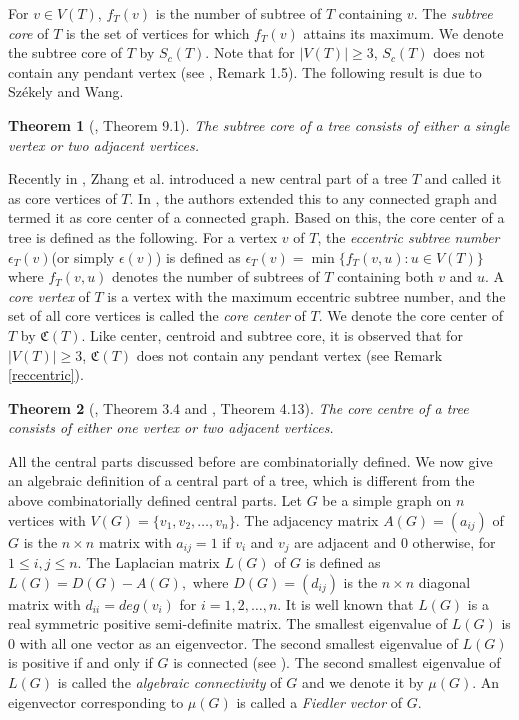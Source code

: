 \documentclass[11pt]{article}
\newtheorem{theorem}{Theorem}[section]
\begin{document}
For $v\in V(T)$, $f_T(v)$ is the number of subtree of $T$ containing $v$. The {\it subtree core} of $T$ is the set of vertices for which $f_T(v)$ attains its maximum. We denote the subtree core of $T$ by $S_c(T)$. Note that for $|V(T)|\geq 3$, $S_c(T)$ does not contain any pendant vertex (see \cite{Des}, Remark 1.5). The following result is due to  Sz\'ekely and Wang.

\begin{theorem}[\cite{Sze}, Theorem 9.1]\label{S and W}
The subtree core of a tree consists of either a single vertex or two adjacent vertices.
\end{theorem}

Recently in \cite{Zhang}, Zhang et al. introduced a new central part of a tree $T$ and called it as core vertices of $T$. In \cite{Pandey3}, the authors extended this to any connected graph and termed it as core center of a connected graph. Based on this, the core center of a  tree is defined as the following. For a vertex $v$ of  $T$, the {\it eccentric subtree number} $\epsilon_T(v)$(or simply $\epsilon(v)$) is defined as $\epsilon_T(v)=\min\{f_T(v,u): u\in V(T)\}$ where $f_T(v,u)$ denotes the number of subtrees of $T$ containing both $v$ and $u$. A {\it core vertex} of $T$ is a vertex with the maximum eccentric subtree number, and the set of all core vertices is called the {\it core center} of $T$. We denote the  core center of $T$ by $\mathfrak{C}(T)$. Like center, centroid and subtree core, it  is observed that for $|V(T)|\geq 3$,  $\mathfrak{C}(T)$ does not contain any pendant vertex (see Remark \ref{reccentric}).
 
\begin{theorem}[\cite{Zhang}, Theorem 3.4 and \cite{Pandey3}, Theorem 4.13]\label{zha}
The core centre of a tree consists of either one vertex or two adjacent vertices.
\end{theorem}

All the central parts discussed before are combinatorially defined. We now give an algebraic definition of a central part of a tree, which is different from  the  above combinatorially defined central parts. Let $G$ be a simple graph on $n$ vertices with $V(G)=\{v_1,v_2,\ldots,v_n\}$.  The adjacency matrix $A(G)=(a_{ij})$ of $G$ is the $n\times n$ matrix with $a_{ij}=1$ if $v_i$ and $v_j$ are adjacent and $0$ otherwise, for $1\leq i,j \leq n$. The Laplacian matrix $L(G)$ of $G$ is defined as $L(G)=D(G)-A(G),$ where $D(G)=(d_{ij})$  is the $n\times n$ diagonal matrix with $d_{ii}=deg(v_i)$ for $i=1,2,\ldots,n$. It is well known that $L(G)$ is a real symmetric positive semi-definite  matrix. The smallest eigenvalue of $L(G)$ is $0$ with all one vector as an eigenvector. The second smallest eigenvalue of $L(G)$  is positive if and only if $G$ is connected (see \cite{Fie1}). The second smallest eigenvalue of $L(G)$ is called the {\it algebraic connectivity} of $G$ and we  denote it by $\mu(G)$. An eigenvector corresponding to $\mu(G)$ is called a {\it Fiedler vector} of $G.$
\end{document}
